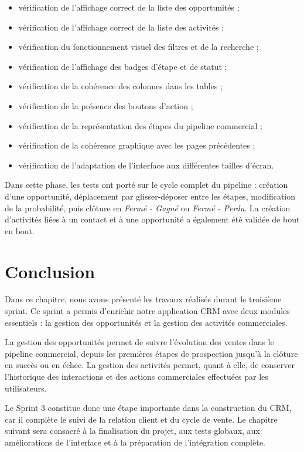 \documentclass[12pt,a4paper,twoside,openany]{book}
\begin{document}
\begin{itemize}
    \item vérification de l’affichage correct de la liste des opportunités ;
    \item vérification de l’affichage correct de la liste des activités ;
    \item vérification du fonctionnement visuel des filtres et de la recherche ;
    \item vérification de l’affichage des badges d’étape et de statut ;
    \item vérification de la cohérence des colonnes dans les tables ;
    \item vérification de la présence des boutons d’action ;
    \item vérification de la représentation des étapes du pipeline commercial ;
    \item vérification de la cohérence graphique avec les pages précédentes ;
    \item vérification de l’adaptation de l’interface aux différentes tailles d’écran.
\end{itemize}

Dans cette phase, les tests ont porté sur le cycle complet du pipeline : création d’une opportunité, déplacement par glisser-déposer entre les étapes, modification de la probabilité, puis clôture en \textit{Fermé - Gagné} ou \textit{Fermé - Perdu}. La création d’activités liées à un contact et à une opportunité a également été validée de bout en bout.

\section*{Conclusion}

Dans ce chapitre, nous avons présenté les travaux réalisés durant le troisième sprint. Ce sprint a permis d’enrichir notre application CRM avec deux modules essentiels : la gestion des opportunités et la gestion des activités commerciales.

La gestion des opportunités permet de suivre l’évolution des ventes dans le pipeline commercial, depuis les premières étapes de prospection jusqu’à la clôture en succès ou en échec. La gestion des activités permet, quant à elle, de conserver l’historique des interactions et des actions commerciales effectuées par les utilisateurs.

Le Sprint 3 constitue donc une étape importante dans la construction du CRM, car il complète le suivi de la relation client et du cycle de vente. Le chapitre suivant sera consacré à la finalisation du projet, aux tests globaux, aux améliorations de l’interface et à la préparation de l’intégration complète.
\end{document}

